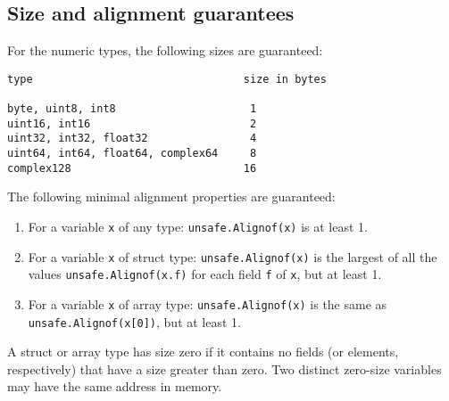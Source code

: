 \subsection*{Size and alignment guarantees}

For the numeric types, the following sizes are guaranteed:

\begin{Verbatim}[frame=single]
type                                 size in bytes

byte, uint8, int8                     1
uint16, int16                         2
uint32, int32, float32                4
uint64, int64, float64, complex64     8
complex128                           16
\end{Verbatim}

The following minimal alignment properties are guaranteed:

\begin{enumerate}
\item
  For a variable \texttt{x} of any type: \texttt{unsafe.Alignof(x)} is
  at least 1.
\item
  For a variable \texttt{x} of struct type: \texttt{unsafe.Alignof(x)}
  is the largest of all the values \texttt{unsafe.Alignof(x.f)} for each
  field \texttt{f} of \texttt{x}, but at least 1.
\item
  For a variable \texttt{x} of array type: \texttt{unsafe.Alignof(x)} is
  the same as \texttt{unsafe.Alignof(x{[}0{]})}, but at least 1.
\end{enumerate}

A struct or array type has size zero if it contains no fields (or
elements, respectively) that have a size greater than zero. Two distinct
zero-size variables may have the same address in memory.
